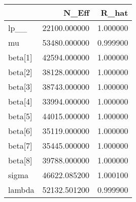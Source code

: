 \begin{tabular}{lrr}
\toprule
 & N\_Eff & R\_hat \\
\midrule
lp\_\_ & 22100.000000 & 1.000000 \\
mu & 53480.000000 & 0.999900 \\
beta[1] & 42594.000000 & 1.000000 \\
beta[2] & 38128.000000 & 1.000000 \\
beta[3] & 38743.000000 & 1.000000 \\
beta[4] & 33994.000000 & 1.000000 \\
beta[5] & 44015.000000 & 1.000000 \\
beta[6] & 35119.000000 & 1.000000 \\
beta[7] & 35445.000000 & 1.000000 \\
beta[8] & 39788.000000 & 1.000000 \\
sigma & 46622.085200 & 1.000100 \\
lambda & 52132.501200 & 0.999900 \\
\bottomrule
\end{tabular}
